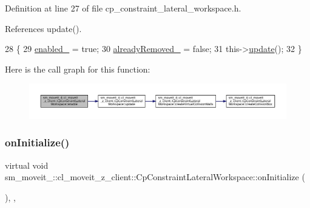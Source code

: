 Definition at line 27 of file cp\+\_\+constraint\+\_\+lateral\+\_\+workspace.\+h.



References update().


\begin{DoxyCode}
28             \{
29                 \hyperlink{classsm__moveit__4_1_1cl__moveit__z__client_1_1CpConstraintLateralWorkspace_a869220e440aadc79cf5213b6d27c1217}{enabled\_} = \textcolor{keyword}{true};
30                 \hyperlink{classsm__moveit__4_1_1cl__moveit__z__client_1_1CpConstraintLateralWorkspace_a9d195448b13cc11a2043197ee4885e05}{alreadyRemoved\_} = \textcolor{keyword}{false};
31                 this->\hyperlink{classsm__moveit__4_1_1cl__moveit__z__client_1_1CpConstraintLateralWorkspace_a83138028b5fab59b84b9170c5df24a54}{update}();
32             \}
\end{DoxyCode}
Here is the call graph for this function\+:
\nopagebreak
\begin{figure}[H]
\begin{center}
\leavevmode
\includegraphics[width=350pt]{classsm__moveit__4_1_1cl__moveit__z__client_1_1CpConstraintLateralWorkspace_afa4487214f0213724159264de374267b_cgraph}
\end{center}
\end{figure}
\mbox{\label{classsm__moveit__4_1_1cl__moveit__z__client_1_1CpConstraintLateralWorkspace_af50ccf402ab65fe3702188e5bdbcfdad}} 
\subsubsection{\texorpdfstring{on\+Initialize()}{onInitialize()}}
{\footnotesize\ttfamily virtual void sm\+\_\+moveit\+\_\+::cl\+\_\+moveit\+\_\+z\+\_\+client\+::\+Cp\+Constraint\+Lateral\+Workspace\+::on\+Initialize (\begin{DoxyParamCaption}{ }\end{DoxyParamCaption})\hspace{0.3cm}{\ttfamily [inline]}, {\ttfamily [override]}, {\ttfamily [virtual]}}



